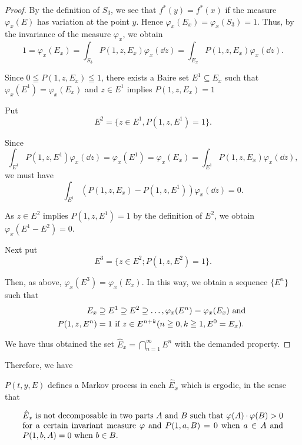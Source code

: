 \begin{proof}
 By the definition of $S_{3}$, we see that $f^{*}(y) = f^{*}(x)$ if the measure $\varphi_{x}(E)$ has variation at the point $y$. Hence $\varphi_{x}(E_{x}) = \varphi_{x}(S_{3}) = 1$. Thus, by the invariance of the measure $\varphi_{x}$, we obtain 
\[
1 = \varphi_{x} (E _{x}) = \int_ {S _{3}} P (1, z, E _{x}) \varphi_{x} (\dd z) = \int_ {E _{x}} P (1, z, E _{x}) \varphi_{x} (\dd z). \]

Since $0 \leqq P(1, z, E_x) \leqq 1$, there exists a Baire set $E^1 \subseteq E_x$ such that 
$\varphi_{x}(E^{1}) = \varphi_{x}(E_{x})$ and $z\in E^{1}$ implies $P(1,z,E_x) = 1$ 

Put 
\[
E ^{2} = \{z \in E ^{1}, P (1, z, E ^{1}) = 1 \}.
\]

Since 
\[
\int_ {E ^{1}} P (1, z, E ^{1}) \varphi_{x} (\dd z) = \varphi_{x} (E ^{1}) = \varphi_{x} (E _{x}) = \int_ {E ^{1}} P (1, z, E _{x}) \varphi_{x} (\dd z),
\]
we must have 
\[
\int_ {E ^{1}} \left(P (1, z, E _{x}) - P (1, z, E ^{1})\right) \varphi_{x} (\dd z) = 0.
\]

As $z \in E^2$ implies $P(1, z, E^1) = 1$ by the definition of $E^2$, we obtain $\varphi_x(E^1 - E^2) = 0$. 

Next put 
\[
E ^{3} = \{z \in E ^{2}; P (1, z, E ^{2}) = 1 \}.
\]

Then, as above, $\varphi_{x}(E^{3}) = \varphi_{x}(E_{x})$. In this way, we obtain a sequence $\{E^n\}$ such that 
\begin{align}
E _{x}& \supseteq E ^{1} \supseteq E ^{2} \supseteq \dots , \varphi_{x} (E ^{n}) = \varphi_{x} (E _{x}) \text{ and } \notag \\
P (1, z, E ^{n})& = 1 \text{ if } z \in E ^{n+k} (n \geqq 0, k \geqq 1, E ^{0} = E _{x}). \notag
\end{align}

We have thus obtained the set $\hat{E}_x = \bigcap\limits_{n=1}^{\infty} E^n$ with the demanded property. 
\end{proof}
Therefore, we have 

\begin{theorem}\label{thm:XIII.4.Theorem.3} $P(t, y, E)$ defines a Markov process in each $\hat{E}_x$ which is ergodic, in the sense that 

\begin{equation}\label{eq:XIII.4.18}
\parbox{0.92\linewidth}{\everymath{}\let\limits\nolimits $\hat{E}_x$ is not decomposable in two parts $A$ and $B$ such that $\varphi(A) \cdot \varphi(B) > 0$ for a certain invariant measure $\varphi$ and $P(1, a, B) = 0$ when $a \in A$ and $P(1, b, A) = 0$ when $b \in B$.}
\end{equation} 
\end{theorem}


